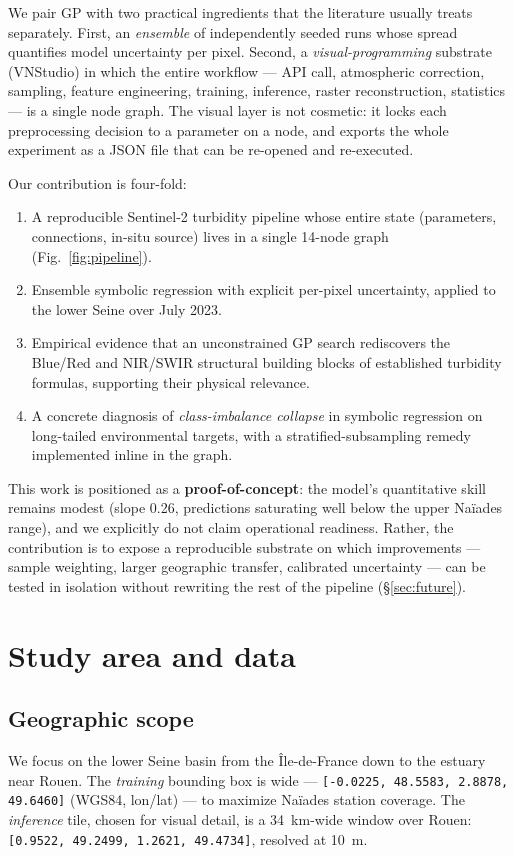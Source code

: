 \documentclass[11pt,a4paper]{article}
\begin{document}
We pair GP with two practical ingredients that the literature usually treats separately. First, an \emph{ensemble} of independently seeded runs whose spread quantifies model uncertainty per pixel. Second, a \emph{visual-programming} substrate (VNStudio) in which the entire workflow --- API call, atmospheric correction, sampling, feature engineering, training, inference, raster reconstruction, statistics --- is a single node graph. The visual layer is not cosmetic: it locks each preprocessing decision to a parameter on a node, and exports the whole experiment as a JSON file that can be re-opened and re-executed.

Our contribution is four-fold:
\begin{enumerate}
    \item A reproducible Sentinel-2 turbidity pipeline whose entire state (parameters, connections, in-situ source) lives in a single 14-node graph (Fig.~\ref{fig:pipeline}).
    \item Ensemble symbolic regression with explicit per-pixel uncertainty, applied to the lower Seine over July 2023.
    \item Empirical evidence that an unconstrained GP search rediscovers the Blue/Red and NIR/SWIR structural building blocks of established turbidity formulas, supporting their physical relevance.
    \item A concrete diagnosis of \emph{class-imbalance collapse} in symbolic regression on long-tailed environmental targets, with a stratified-subsampling remedy implemented inline in the graph.
\end{enumerate}

This work is positioned as a \textbf{proof-of-concept}: the model's quantitative skill remains modest (slope 0.26, predictions saturating well below the upper Naïades range), and we explicitly do not claim operational readiness. Rather, the contribution is to expose a reproducible substrate on which improvements --- sample weighting, larger geographic transfer, calibrated uncertainty --- can be tested in isolation without rewriting the rest of the pipeline (\S\ref{sec:future}).

\section{Study area and data}
\label{sec:data}

\subsection{Geographic scope}
We focus on the lower Seine basin from the Île-de-France down to the estuary near Rouen. The \emph{training} bounding box is wide --- \texttt{[-0.0225, 48.5583, 2.8878, 49.6460]} (WGS84, lon/lat) --- to maximize Naïades station coverage. The \emph{inference} tile, chosen for visual detail, is a \SI{34}{\kilo\metre}-wide window over Rouen: \texttt{[0.9522, 49.2499, 1.2621, 49.4734]}, resolved at \SI{10}{\metre}.
\end{document}
